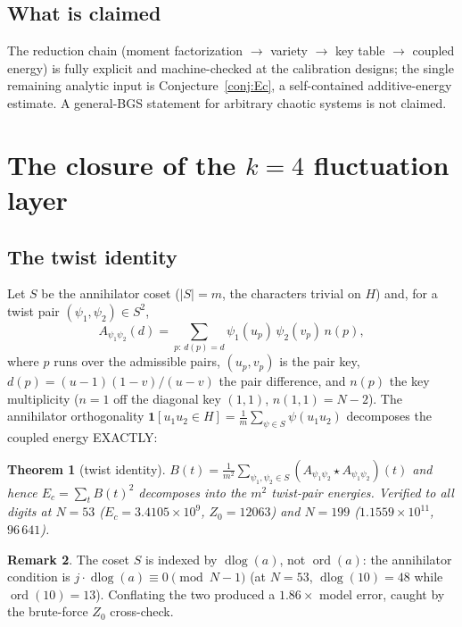 \documentclass[11pt,reqno]{amsart}
\newtheorem{theorem}{Theorem}[section]
\theoremstyle{definition}
\newtheorem{remark}[theorem]{Remark}
\begin{document}
\subsection{What is claimed}

The reduction chain (moment factorization $\to$ variety $\to$ key
table $\to$ coupled energy) is fully explicit and machine-checked at
the calibration designs; the single remaining analytic input is
Conjecture~\ref{conj:Ec}, a self-contained additive-energy estimate.
A general-BGS statement for arbitrary chaotic systems is not claimed.



\section{The closure of the \texorpdfstring{$k=4$}{k=4} fluctuation layer}
\label{sec:r95}

\subsection{The twist identity}

Let $S$ be the annihilator coset ($|S| = m$, the characters trivial on
$H$) and, for a twist pair $(\psi_1,\psi_2) \in S^2$,
\[
  A_{\psi_1\psi_2}(d) = \sum_{p:\, d(p) = d} \psi_1(u_p)\,\psi_2(v_p)\,n(p),
\]
where $p$ runs over the admissible pairs, $(u_p,v_p)$ is the pair key,
$d(p) = (u{-}1)(1{-}v)/(u{-}v)$ the pair difference, and $n(p)$ the key
multiplicity ($n = 1$ off the diagonal key $(1,1)$, $n(1,1) = N{-}2$).
The annihilator orthogonality
$\mathbf{1}[u_1u_2 \in H] = \tfrac{1}{m}\sum_{\psi \in S}\psi(u_1u_2)$
decomposes the coupled energy EXACTLY:

\begin{theorem}[twist identity]
\label{thm:twist}
$B(t) = \tfrac{1}{m^2}\sum_{\psi_1,\psi_2 \in S}
(A_{\psi_1\psi_2} \star A_{\psi_1\psi_2})(t)$ and hence
$E_c = \sum_t B(t)^2$ decomposes into the $m^2$ twist-pair energies.
Verified to all digits at $N = 53$ ($E_c = 3.4105 \times 10^9$, $Z_0 =
12063$) and $N = 199$ ($1.1559 \times 10^{11}$, $96\,641$).
\end{theorem}

\begin{remark}
The coset $S$ is indexed by $\operatorname{dlog}(a)$, not
$\operatorname{ord}(a)$: the annihilator condition is
$j \cdot \operatorname{dlog}(a) \equiv 0 \pmod{N-1}$ (at $N = 53$,
$\operatorname{dlog}(10) = 48$ while $\operatorname{ord}(10) = 13$).
Conflating the two produced a $1.86\times$ model error, caught by the
brute-force $Z_0$ cross-check.
\end{remark}
\end{document}
